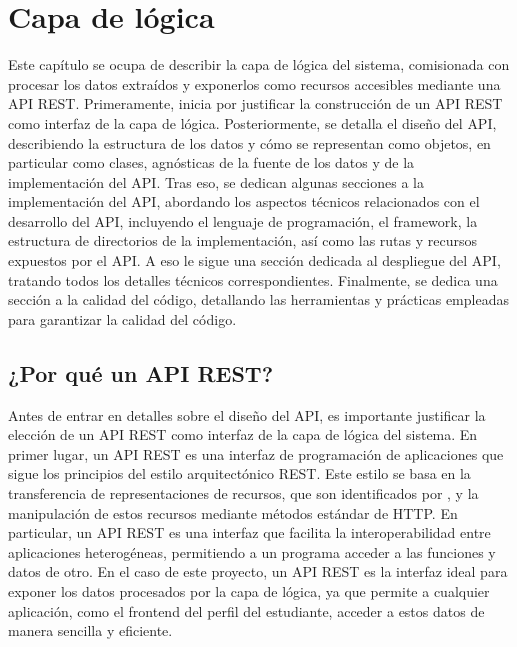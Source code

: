 \chapter{Capa de lógica}
\label{ch:logica}

Este capítulo se ocupa de describir la capa de lógica del sistema, comisionada con procesar los datos extraídos y exponerlos como recursos accesibles mediante una \gls{API REST}. Primeramente, inicia por justificar la construcción de un \gls{API REST} como interfaz de la capa de lógica. Posteriormente, se detalla el diseño del \gls{API}, describiendo la estructura de los datos y cómo se representan como objetos, en particular como clases, agnósticas de la fuente de los datos y de la implementación del \gls{API}. Tras eso, se dedican algunas secciones a la implementación del \gls{API}, abordando los aspectos técnicos relacionados con el desarrollo del \gls{API}, incluyendo el lenguaje de programación, el framework, la estructura de directorios de la implementación, así como las rutas y recursos expuestos por el \gls{API}. A eso le sigue una sección dedicada al despliegue del \gls{API}, tratando todos los detalles técnicos correspondientes. Finalmente, se dedica una sección a la calidad del código, detallando las herramientas y prácticas empleadas para garantizar la calidad del código.

\section{¿Por qué un API REST?}

Antes de entrar en detalles sobre el diseño del \gls{API}, es importante justificar la elección de un \gls{API REST} como interfaz de la capa de lógica del sistema. En primer lugar, un \gls{API REST} es una interfaz de programación de aplicaciones que sigue los principios del estilo arquitectónico \gls{REST}. Este estilo se basa en la transferencia de representaciones de recursos, que son identificados por , y la manipulación de estos recursos mediante métodos estándar de \gls{HTTP}. En particular, un \gls{API REST} es una interfaz que facilita la interoperabilidad entre aplicaciones heterogéneas, permitiendo a un programa acceder a las funciones y datos de otro. En el caso de este proyecto, un \gls{API REST} es la interfaz ideal para exponer los datos procesados por la capa de lógica, ya que permite a cualquier aplicación, como el frontend del perfil del estudiante, acceder a estos datos de manera sencilla y eficiente.

